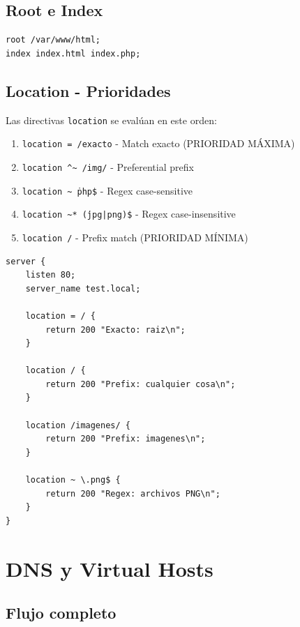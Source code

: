 \documentclass[11pt,a4paper]{article}
\begin{document}
\subsection{Root e Index}
\begin{lstlisting}
root /var/www/html;
index index.html index.php;
\end{lstlisting}

\subsection{Location - Prioridades}

Las directivas \texttt{location} se evalúan en este orden:

\begin{enumerate}
    \item \texttt{location = /exacto} - Match exacto (PRIORIDAD MÁXIMA)
    \item \texttt{location \^{}\~{} /img/} - Preferential prefix
    \item \texttt{location \~{} \.php\$} - Regex case-sensitive
    \item \texttt{location \~{}* \.(jpg|png)\$} - Regex case-insensitive
    \item \texttt{location /} - Prefix match (PRIORIDAD MÍNIMA)
\end{enumerate}

\begin{lstlisting}[caption=Ejemplo de prioridades]
server {
    listen 80;
    server_name test.local;
    
    location = / {
        return 200 "Exacto: raiz\n";
    }
    
    location / {
        return 200 "Prefix: cualquier cosa\n";
    }
    
    location /imagenes/ {
        return 200 "Prefix: imagenes\n";
    }
    
    location ~ \.png$ {
        return 200 "Regex: archivos PNG\n";
    }
}
\end{lstlisting}

\section{DNS y Virtual Hosts}

\subsection{Flujo completo}
\end{document}
